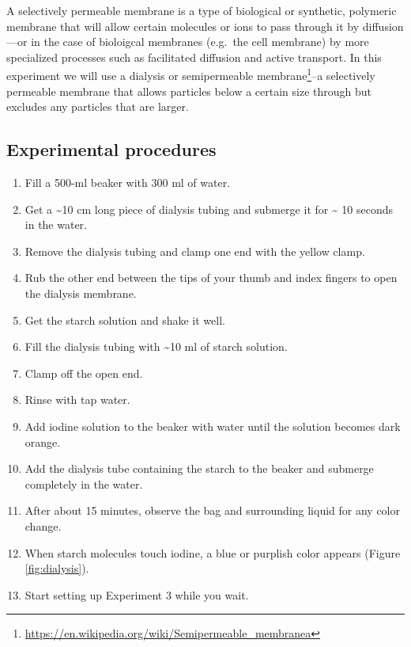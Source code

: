 \documentclass[]{book}
\providecommand{\tightlist}{%
  \setlength{\itemsep}{0pt}\setlength{\parskip}{0pt}}
\let\rmarkdownfootnote\footnote%
\def\footnote{\protect\rmarkdownfootnote}
\renewcommand{\href}[2]{#2\footnote{\url{#1}}}
\theoremstyle{definition}
\theoremstyle{definition}
\theoremstyle{definition}
\theoremstyle{remark}
\begin{document}
A selectively permeable membrane is a type of biological or synthetic,
polymeric membrane that will allow certain molecules or ions to pass
through it by diffusion---or in the case of bioloigcal membranes
(e.g.~the cell membrane) by more specialized processes such as
facilitated diffusion and active transport. In this experiment we will
use a dialysis or
\href{https://en.wikipedia.org/wiki/Semipermeable_membranea}{semipermeable
membrane}--a selectively permeable membrane that allows particles below
a certain size through but excludes any particles that are larger.

\subsection{Experimental procedures}\label{experimental-procedures-16}

\begin{enumerate}
\def\labelenumi{\arabic{enumi}.}
\tightlist
\item
  Fill a 500-ml beaker with 300 ml of water.
\item
  Get a \textasciitilde{}10 cm long piece of dialysis tubing and
  submerge it for \textasciitilde{} 10 seconds in the water.
\item
  Remove the dialysis tubing and clamp one end with the yellow clamp.
\item
  Rub the other end between the tips of your thumb and index fingers to
  open the dialysis membrane.
\item
  Get the starch solution and shake it well.
\item
  Fill the dialysis tubing with \textasciitilde{}10 ml of starch
  solution.
\item
  Clamp off the open end.
\item
  Rinse with tap water.
\item
  Add iodine solution to the beaker with water until the solution
  becomes dark orange.
\item
  Add the dialysis tube containing the starch to the beaker and submerge
  completely in the water.
\item
  After about 15 minutes, observe the bag and surrounding liquid for any
  color change.
\item
  When starch molecules touch iodine, a blue or purplish color appears
  (Figure \ref{fig:dialysis}).
\item
  Start setting up Experiment 3 while you wait.
\end{enumerate}
\end{document}
